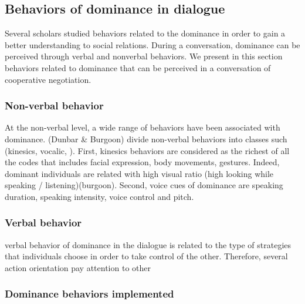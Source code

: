 \documentclass{llncs}
\begin{document}
 \subsection{Behaviors of dominance in dialogue}
  Several scholars studied behaviors related to the dominance in order to gain a better understanding to social relations. During a conversation, dominance can be perceived through verbal and nonverbal behaviors. We present in this section behaviors related to dominance that can be perceived in a conversation of cooperative negotiation.
 \subsubsection{Non-verbal behavior}
At the non-verbal level, a wide range of behaviors have been associated with dominance. (Dunbar \& Burgoon) divide non-verbal behaviors into classes such (kinesics, vocalic, ). First, kinesics behaviors are considered as the richest of all the codes that includes facial expression, body movements, gestures. Indeed, dominant individuals are related with high visual ratio (high looking while speaking / listening)(burgoon).  Second, voice cues of dominance are speaking duration, speaking intensity, voice control and pitch. 
 \subsubsection{Verbal behavior}
verbal behavior of dominance in the dialogue is related to the type of strategies that individuals choose in order to take control of the other. Therefore, several 
action orientation 
pay attention to other

\subsubsection{Dominance behaviors implemented}
\noindent 
\vskip 4pt


\end{document}
